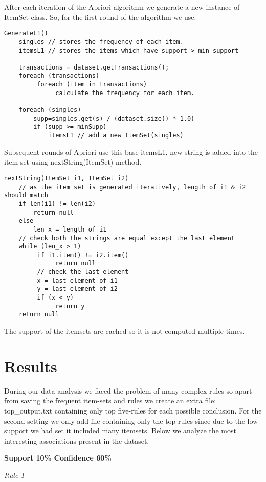 \documentclass[11pt]{article}
\begin{document}
After each iteration of the Apriori algorithm we generate a new instance of ItemSet class.
So, for the first round of the algorithm we use.

\begin{verbatim}
GenerateL1()
    singles // stores the frequency of each item.
    itemsL1 // stores the items which have support > min_support
    
    transactions = dataset.getTransactions();
    foreach (transactions)
         foreach (item in transactions)
              calculate the frequency for each item.
    
    foreach (singles)
        supp=singles.get(s) / (dataset.size() * 1.0)
        if (supp >= minSupp) 
            itemsL1 // add a new ItemSet(singles)
\end{verbatim}

Subsequent rounds of Apriori use this base itemsL1, new string is added into the item set using nextString(ItemSet) method.

\begin{verbatim}
nextString(ItemSet i1, ItemSet i2)
    // as the item set is generated iteratively, length of i1 & i2 should match
    if len(i1) != len(i2)
        return null        
    else 
        len_x = length of i1
    // check both the strings are equal except the last element
    while (len_x > 1)
         if i1.item() != i2.item()
              return null
         // check the last element
         x = last element of i1
         y = last element of i2
         if (x < y)
              return y
    return null
\end{verbatim}

The support of the itemsets are cached so it is not computed multiple times.
\section{Results}

During our data analysis we faced the problem of many complex rules  so apart from saving the frequent item-sets and rules we create an extra file: top\_output.txt containing only top five-rules for each possible conclusion. For the second setting we only add file containing only the top rules since due to the low support we had set it included many itemsets. Below we analyze the most interesting associations present in the dataset.

\textbf{Support 10\% Confidence 60\%}

\textit{Rule 1}
\end{document}
